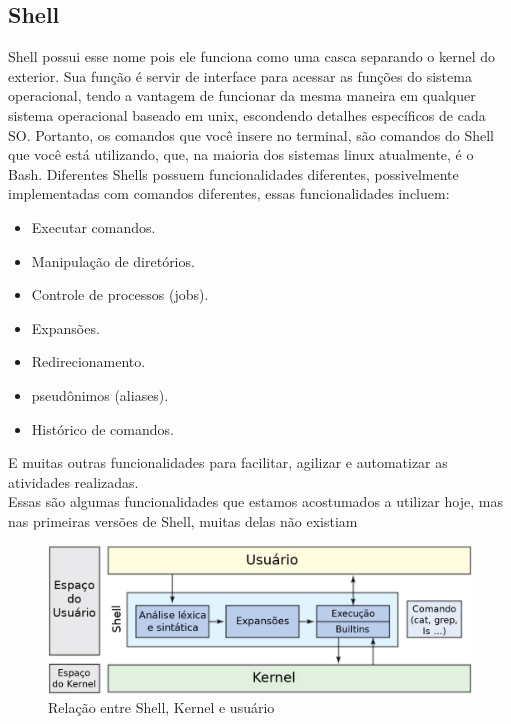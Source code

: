 \documentclass[oneside, 11 pt]{article}
\begin{document}
	\subsection{Shell}
	Shell possui esse nome pois ele funciona como uma casca separando o kernel do exterior. Sua função é servir de interface para acessar as funções do sistema operacional, tendo a vantagem de funcionar da mesma maneira em qualquer sistema operacional baseado em unix, escondendo detalhes específicos de cada SO.
	Portanto, os comandos que você insere no terminal, são comandos do Shell que você está utilizando, que, na maioria dos sistemas linux atualmente, é o Bash. Diferentes Shells possuem funcionalidades diferentes, possivelmente implementadas com comandos diferentes, essas funcionalidades incluem:
	\begin{itemize}
		\item Executar comandos.
		\item Manipulação de diretórios.
		\item Controle de processos (jobs).
		\item Expansões.
		\item Redirecionamento.
		\item pseudônimos (aliases).
		\item Histórico de comandos.
	\end{itemize}
	E muitas outras funcionalidades para facilitar, agilizar e automatizar as atividades realizadas.\\
	Essas são algumas funcionalidades que estamos acostumados a utilizar hoje, mas nas primeiras versões de Shell, muitas delas não existiam
	\\
	\begin{figure}[h]
		\includegraphics[width=\linewidth]{shell_struct1.png}
		\caption{Relação entre Shell, Kernel e usuário}
		\label{fig:shellstruct}
	\end{figure}
	
\end{document}
